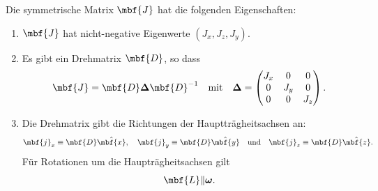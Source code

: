 Die symmetrische Matrix $\mbf{J}$ hat die folgenden Eigenschaften:
\begin{enumerate}
  \item $\mbf{J}$ hat nicht-negative Eigenwerte $(J_x,J_z,J_y)$.
  \item Es gibt ein Drehmatrix $\mbf{D}$, so dass
  \begin{equation}
    \mbf{J} = \mbf{D}\boldsymbol{\Delta}\mbf{D}^{-1} \quad \text{mit}\quad \boldsymbol{\Delta}=\begin{pmatrix}
      J_x & 0 & 0 \\
      0 & J_y & 0 \\
      0 & 0 & J_z
    \end{pmatrix}.
  \end{equation}
  \item Die Drehmatrix gibt die Richtungen der Hauptträgheitsachsen an:
  \begin{equation}
    \mbf{j}_x \equiv \mbf{D}\hat{\mbf{x}}, \quad \mbf{j}_y \equiv \mbf{D}\hat{\mbf{y}} \quad \text{und}\quad \mbf{j}_z \equiv \mbf{D}\hat{\mbf{z}}.
  \end{equation}
  Für Rotationen um die Haupträgheitsachsen gilt
  \begin{equation}
    \mbf{L} \| \boldsymbol{\omega}.
  \end{equation}  
\end{enumerate}

